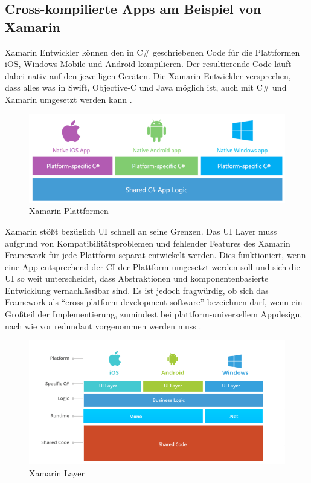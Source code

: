 \subsection{Cross-kompilierte Apps am Beispiel von Xamarin}

Xamarin Entwickler können den in C\# geschriebenen Code für die Plattformen iOS, Windows Mobile und Android kompilieren.
Der resultierende Code läuft dabei nativ auf den jeweiligen Geräten.
Die Xamarin Entwickler versprechen, dass alles was in Swift, Objective-C und
Java möglich ist, auch mit C\# und Xamarin umgesetzt werden kann \cite{projectxamarin}.

\begin{figure}[ht]
 \centering
 \includegraphics[width=0.8\linewidth]{kapitel2/csharp_xamarin.png}
 \caption{Xamarin Plattformen \cite{7Reas20:online}}
\end{figure}
\vspace{1cm}

\noindent
Xamarin stößt bezüglich \ac{UI} schnell an seine Grenzen. Das \ac{UI} Layer muss aufgrund von Kompatibilitätsproblemen und fehlender Features des Xamarin Framework
für jede Plattform separat entwickelt werden. Dies funktioniert, wenn eine App entsprechend der \ac{CI} der Plattform umgesetzt werden soll und sich die \ac{UI} so weit unterscheidet,
dass Abstraktionen und komponentenbasierte Entwicklung vernachlässibar sind. Es ist jedoch fragwürdig, ob sich das Framework als ``cross-platform development software'' bezeichnen darf,
wenn ein Großteil der Implementierung, zumindest bei plattform-universellem Appdesign, nach wie vor redundant vorgenommen werden muss \cite{7Reas20:online}.

\begin{figure}[ht]
 \centering
 \includegraphics[width=0.8\linewidth]{kapitel2/xamarin_ui_blocker.png}
 \caption{Xamarin Layer \cite{7Reas20:online}}
\end{figure}

